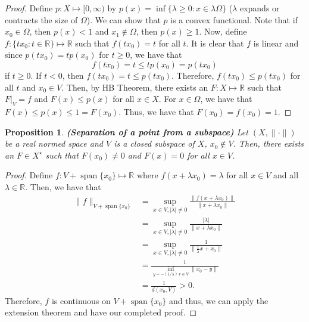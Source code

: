 \documentclass[12pt]{article}
\newtheorem{proposition}{Proposition}
\newcommand{\R}{{\mathbb R}}
\newcommand{\Om}{\Omega}
\newcommand{\Xs}{X^{\star}}
\DeclareMathOperator*{\spa}{span}
\newcommand{\ns}{(X, \| \cdot \|)}
\begin{document}
\begin{proof}
Define $p: X \mapsto [0, \infty)$ by $p(x) = \inf \{ \lambda \geq 0 : x \in \lambda \Om \}$ ($\lambda$ expands or contracts the size of $\Om$). We can show that $p$ is a convex functional. Note that if $x_0 \in \Om$, then $p(x) < 1$ and $x_1 \not\in \Om$, then $p(x) \geq 1$. Now, define $f: \{ t x_0 : t \in \R\} \mapsto \R$ such that $f(t x_0) = t$ for all $t$. It is clear that $f$ is linear and since $p(tx_0) = t p(x_0)$ for $t \geq 0$, we have that 
\[ f(tx_0) = t \leq tp(x_0) = p(t x_0) \]
if $t \geq 0$. If $t < 0$, then $f(t x_0) = t \leq p(t x_0)$. Therefore, $f(tx_0) \leq p(t x_0)$ for all $t$ and $x_0 \in V$. Then, by HB Theorem, there exists an $F: X \mapsto \R$ such that $F\vert_V = f$ and $F(x) \leq p(x)$ for all $x \in X$. For $x \in \Om$, we have that $F(x) \leq p(x) \leq 1 = F(x_0)$. Thus, we have that $F(x_0) = f(x_0) = 1$. 
\end{proof} 
\begin{proposition}\textbf{(Separation of a point from a subspace)}
Let $\ns$ be a real normed space and $V$ is a closed subspace of $X$, $x_0 \not\in V$. Then, there exists an $F \in \Xs$ such that $F(x_0) \neq 0$ and $F(x) = 0$ for all $x \in V$. 
\end{proposition}
\vspace{-25pt}
\begin{proof}
Define $f: V + \spa\{ x_0 \} \mapsto \R$ where $f(x + \lambda x_0) = \lambda$ for all $x \in V$ and all $\lambda \in \R$. Then, we have that 
\begin{align*}
\| f \|_{V + \spa\{ x_0 \}} & = \sup\limits_{x \in V, |\lambda| \neq 0} \frac{\| f(x + \lambda x_0)\|}{\| x + \lambda x_0 \|} \\
& = \sup\limits_{x \in V, |\lambda| \neq 0} \frac{|\lambda|}{\| x + \lambda x_0 \|} \\
& = \sup\limits_{x \in V, |\lambda| \neq 0} \frac{1}{\| \frac{1}{\lambda} x +x_0\|} \\
& = \frac{1}{\inf\limits_{y =-(1/\lambda)\,  x \in V} \| x_0 -y \|}\\
& = \frac{1}{d(x_0, V)} > 0.
\end{align*}
Therefore, $f$ is continuous on $V + \spa\{ x_0 \}$ and thus, we can apply the extension theorem and have our completed proof. 
\end{proof}
\end{document}
